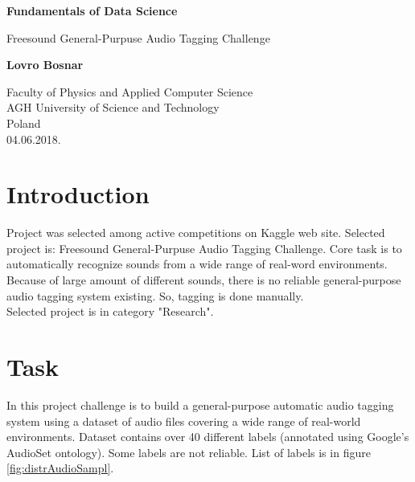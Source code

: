 \documentclass{article}
\begin{document}
\begin{titlepage}
    \begin{center}
        \vspace*{1cm}
        
        \Huge
        \textbf{Fundamentals of Data Science}
        
        \vspace{0.5cm}
        \LARGE
        Freesound General-Purpuse Audio Tagging Challenge
        
        \vspace{1.5cm}
        
        \textbf{Lovro Bosnar}
        
        \vfill
        
        \Large
        Faculty of Physics and Applied Computer Science\\
        AGH University of Science and Technology\\
        Poland\\
        04.06.2018.
        
    \end{center}
\end{titlepage}

\tableofcontents
\newpage

\section{Introduction}
Project was selected among active competitions on Kaggle web site. Selected project is: Freesound 
General-Purpuse Audio Tagging Challenge. Core task is to automatically recognize sounds from a wide
range of real-word environments. \\
Because of large amount of different sounds, there is no reliable general-purpose audio tagging 
system existing. So, tagging is done manually.\\
Selected project is in category "Research".


\section{Task}
In this project challenge is to build a general-purpose automatic audio tagging system using a dataset 
of audio files covering a wide range of real-world environments. Dataset contains over 40 different 
labels (annotated using Google's AudioSet ontology). Some labels are not reliable. List of labels is in
figure \ref{fig:distrAudioSampl}.
\end{document}
